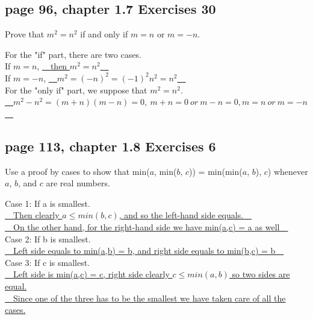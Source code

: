 \documentclass[sigconf]{acmart}
\begin{document}
\subsection{page 96, chapter 1.7 Exercises 30}
\begin{shaded}
    Prove that $m^2 = n^2$ if and only if $m = n$ or $m = −n$.
\end{shaded}
For the "if" part, there are two cases.\\
If $m = n$, \underline{~~then $m^2 = n^2$~~}\\
If $m = -n$, \underline{~~$m^2 = (-n)^2 = (-1)^2n^2 = n^2$~~}\\
For the "only if" part, we suppose that $m^2 = n^2$.\\
\underline{~~$m^2 - n^2 = (m+n)(m-n) = 0,~m+n = 0~or~m-n = 0, m = n~or~m = -n$~~}

\subsection{page 113, chapter 1.8 Exercises 6}
\begin{shaded}
    Use a proof by cases to show that min($a$, min($b$, $c$)) = min(min($a$, $b$), $c$) whenever $a$, $b$, and $c$ are real numbers.
\end{shaded}
Case 1: If a is smallest.\\
\underline{~~Then clearly $a \leq min(b,c)$, and so the left-hand side equals.~~}\\
\underline{~~On the other hand,  for the right-hand side we have min(a,c) = a as well~~}\\
Case 2: If b is smallest.\\
\underline{~~Left side equals to min(a,b) = b, and right side equals to min(b,c) = b~~}\\ 
Case 3: If c is smallest.\\
\underline{~~Left side is min(a,c) = c, right side clearly $c \leq min(a,b)$ so two sides are equal.}\\
\underline{~~Since one of the three has to be the smallest we have taken care of all the cases.}\\

\vspace{16cm}
\end{document}
